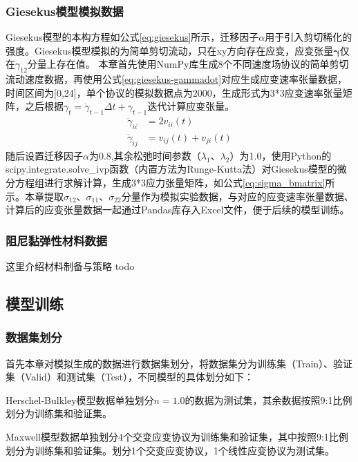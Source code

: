 \subsubsection{Giesekus模型模拟数据}
Giesekus模型的本构方程如公式\eqref{eq:giesekus}所示，迁移因子$\alpha$用于引入剪切稀化的强度。Giesekus模型模拟的为简单剪切流动，只在xy方向存在应变，应变张量$\boldsymbol{\gamma}$仅在$\gamma_{12}$分量上存在值。
本章首先使用NumPy库生成8个不同速度场协议的简单剪切流动速度数据，再使用公式\eqref{eq:giesekus-gammadot}对应生成应变速率张量数据，时间区间为[0,24]，单个协议的模拟数据点为2000，生成形式为3*3应变速率张量矩阵，之后根据$\gamma_{t}=\dot{\gamma}_{t-1}\Delta t+\gamma_{t-1}$迭代计算应变张量。
\begin{equation}
  \begin{aligned}
    \dot{\gamma}_{ii} & = 2 v_{ii}(t)           \\
    \dot{\gamma}_{ij} & = v_{ij}(t) + v_{ji}(t)
  \end{aligned} \label{eq:giesekus-gammadot}
\end{equation}
随后设置迁移因子$\alpha$为0.8,其余松弛时间参数（$\lambda_1$、$\lambda_2$）为1.0，使用Python的scipy.integrate.solve\_ivp函数（内置方法为Runge-Kutta法）对Giesekus模型的微分方程组进行求解计算，生成3*3应力张量矩阵，如公式\eqref{eq:sigma_bmatrix}所示。本章提取$\sigma_{12}$、$\sigma_{11}$、$\sigma_{22}$分量作为模拟实验数据，与对应的应变速率张量数据、计算后的应变张量数据一起通过Pandas库存入Excel文件，便于后续的模型训练。
\subsubsection{阻尼黏弹性材料数据}
这里介绍材料制备与策略 todo
\subsection{模型训练}
\subsubsection{数据集划分}
首先本章对模拟生成的数据进行数据集划分，将数据集分为训练集（Train）、验证集（Valid）和测试集（Test），不同模型的具体划分如下：

Herschel-Bulkley模型数据单独划分$n=1.0$的数据为测试集，其余数据按照9:1比例划分为训练集和验证集。

Maxwell模型数据单独划分4个交变应变协议为训练集和验证集，其中按照9:1比例划分为训练集和验证集。划分1个交变应变协议，1个线性应变协议为测试集。


